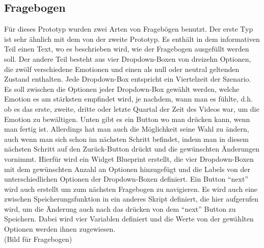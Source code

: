 \subsection{Fragebogen} \label{fragebogen-4}



Für dieses Prototyp wurden zwei Arten von Fragebögen benutzt. 
Der erste Typ ist sehr ähnlich mit dem von der zweite Prototyp. Es enthält in dem informativen Teil einen Text, wo es beschrieben wird, wie der Fragebogen ausgefüllt werden soll. Der andere Teil besteht aus vier Dropdown-Boxen von dreizehn Optionen, die zwölf verschiedene Emotionen und einen als null oder neutral geltenden Zustand enthalten. Jede Dropdown-Box entspricht ein Viertelzeit der Szenario. Es soll zwischen die Optionen jeder Dropdown-Box gewählt werden, welche Emotion es am stärksten empfindet wird, je nachdem, wann man es fühlte, d.h. ob es das erste, zweite, dritte oder letzte Quartal der Zeit des Videos war, um die Emotion zu bewältigen. Unten gibt es ein Button wo man drücken kann, wenn man fertig ist. Allerdings hat man auch die Möglichkeit seine Wahl zu ändern, auch wenn man sich schon im nächsten Schritt befindet, indem man in diesem nächsten Schritt auf den Zurück-Button drückt und die gewünschten Änderungen vornimmt. Hierfür wird ein Widget Blueprint erstellt, die vier Dropdown-Boxen mit dem gewünschten Anzahl an Optionen hinzugefügt und die Labels von der unterschiedlichen Optionen der Dropdown-Boxen definiert. Ein Button ``next'' wird auch erstellt um zum nächsten Fragebogen zu navigieren. Es wird auch eine zwischen Speicherungsfunktion in ein anderes Skript definiert, die hier aufgerufen wird, um die Änderung auch nach das drücken von dem ``next'' Button zu Speichern. Dabei wird vier Variablen definiert und die Werte von der gewählten Optionen werden ihnen zugewiesen. \\

(Bild für Fragebogen) \\


